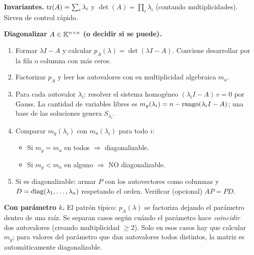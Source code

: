 \begin{teoria}
\textbf{Invariantes.} $\operatorname{tr}(A) = \sum_i \lambda_i$ y $\det(A) = \prod_i \lambda_i$ (contando multiplicidades). Sirven de control rápido.
\end{teoria}

\begin{receta}
\textbf{Diagonalizar $A \in \mathbb{K}^{n\times n}$ (o decidir si se puede).}
\begin{enumerate}
\item Formar $\lambda I - A$ y calcular $p_A(\lambda) = \det(\lambda I - A)$. Conviene desarrollar por la fila o columna con más ceros.
\item Factorizar $p_A$ y leer los autovalores con su multiplicidad algebraica $m_a$.
\item Para cada autovalor $\lambda_i$: resolver el sistema homogéneo $(\lambda_i I - A)\,v = 0$ por Gauss. La cantidad de variables libres es $m_g(\lambda_i) = n - \operatorname{rango}(\lambda_i I - A)$; una base de las soluciones genera $S_{\lambda_i}$.
\item Comparar $m_g(\lambda_i)$ con $m_a(\lambda_i)$ para todo $i$:
  \begin{itemize}
  \item Si $m_g = m_a$ en todos $\Rightarrow$ diagonalizable.
  \item Si $m_g < m_a$ en alguno $\Rightarrow$ NO diagonalizable.
  \end{itemize}
\item Si es diagonalizable: armar $P$ con los autovectores como columnas y $D = \operatorname{diag}(\lambda_1,\dots,\lambda_n)$ respetando el orden. Verificar (opcional) $AP = PD$.
\end{enumerate}

\textbf{Con parámetro $k$.} El patrón típico: $p_A(\lambda)$ se factoriza dejando el parámetro dentro de una raíz. Se separan casos según cuándo el parámetro hace \emph{coincidir} dos autovalores (creando multiplicidad $\ge 2$). Solo en esos casos hay que calcular $m_g$; para valores del parámetro que dan autovalores todos distintos, la matriz es automáticamente diagonalizable.
\end{receta}

